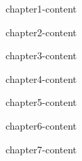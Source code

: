 


\makeglossaries







\maketitle

\begin{frontmatter}

% 

% 

% 

% 



\cleardoublepage
{}
\begin{singlespace}
\tableofcontents
\end{singlespace}

\end{frontmatter}

\pagestyle{plain} %

{chapter1-content}

{chapter2-content}

{chapter3-content}

{chapter4-content}

{chapter5-content}

{chapter6-content}

{chapter7-content}


\printglossary
\printglossary[type=\acronymtype]






